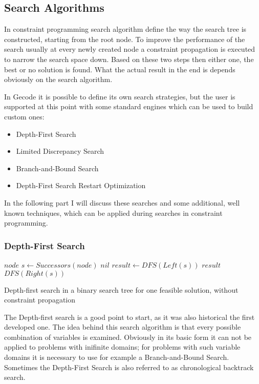 \documentclass[10pt,
               a4paper,
               journal,
               ]{IEEEtran}
\begin{document}
	\subsection{Search Algorithms}
	In constraint programming search algorithm define the way the search tree is constructed, starting from the root node. To improve the performance of the search usually at every newly created node a constraint propagation is executed to narrow the search space down. Based on these two steps then either one, the best or no solution is found. What the actual result in the end is depends obviously on the search algorithm.
	
	In Gecode it is possible to define its own search strategies, but the user is supported at this point with some standard engines which can be used to build custom ones:
	\begin{itemize}
	\item Depth-First Search
	\item Limited Discrepancy Search
	\item Branch-and-Bound Search
	\item Depth-First Search Restart Optimization
	\end{itemize}
	
	In the following part I will discuss these searches and some additional, well known techniques, which can be applied during searches in constraint programming.
	
	\subsubsection{Depth-First Search}
	\begin{algorithm}
		\begin{algorithmic}
					\State \Return $node$
				\EndIf
				\State $s \gets Successors(node)$
					\State \Return $nil$
				\EndIf
				\State $result \gets DFS(Left(s))$
					\State \Return $result$
				\Else
					\State \Return $DFS(Right(s))$
				\EndIf
			\EndFunction
		\end{algorithmic}
		\caption{Depth-first search in a binary search tree for one feasible solution, without constraint propagation}
	\end{algorithm}
	
	The Depth-first search is a good point to start, as it was also historical the first developed one. The idea behind this search algorithm is that every possible combination of variables is examined. Obviously in its basic form it can not be applied to problems with inifinite domains; for problems with such variable domains it is necessary to use for example a Branch-and-Bound Search. Sometimes the Depth-First Search is also referred to as chronological backtrack search.
	
\end{document}

